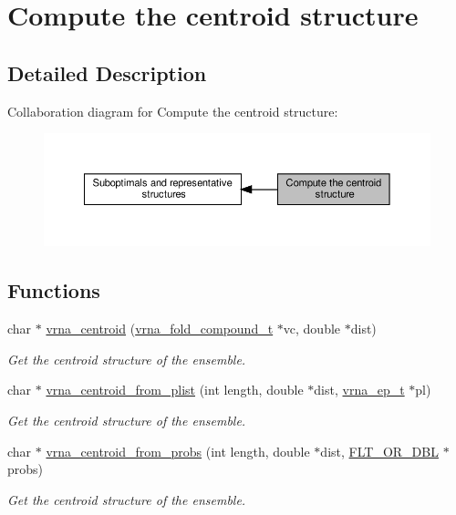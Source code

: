 \hypertarget{group__centroid__fold}{}\section{Compute the centroid structure}
\label{group__centroid__fold}


\subsection{Detailed Description}
Collaboration diagram for Compute the centroid structure\+:
\nopagebreak
\begin{figure}[H]
\begin{center}
\leavevmode
\includegraphics[width=350pt]{group__centroid__fold}
\end{center}
\end{figure}
\subsection*{Functions}
\begin{DoxyCompactItemize}
\item 
char $\ast$ \hyperlink{group__centroid__fold_ga0e64bb67e51963dc71cbd4d30b80a018}{vrna\+\_\+centroid} (\hyperlink{group__fold__compound_ga1b0cef17fd40466cef5968eaeeff6166}{vrna\+\_\+fold\+\_\+compound\+\_\+t} $\ast$vc, double $\ast$dist)
\begin{DoxyCompactList}\small\item\em Get the centroid structure of the ensemble. \end{DoxyCompactList}\item 
char $\ast$ \hyperlink{group__centroid__fold_ga13881673a0b214d42a59140ef5764dbb}{vrna\+\_\+centroid\+\_\+from\+\_\+plist} (int length, double $\ast$dist, \hyperlink{group__struct__utils_gab9ac98ab55ded9fb90043b024b915aca}{vrna\+\_\+ep\+\_\+t} $\ast$pl)
\begin{DoxyCompactList}\small\item\em Get the centroid structure of the ensemble. \end{DoxyCompactList}\item 
char $\ast$ \hyperlink{group__centroid__fold_ga98193ede06778a9ea966cc8fc43d0804}{vrna\+\_\+centroid\+\_\+from\+\_\+probs} (int length, double $\ast$dist, \hyperlink{group__data__structures_ga31125aeace516926bf7f251f759b6126}{F\+L\+T\+\_\+\+O\+R\+\_\+\+D\+BL} $\ast$probs)
\begin{DoxyCompactList}\small\item\em Get the centroid structure of the ensemble. \end{DoxyCompactList}\end{DoxyCompactItemize}



